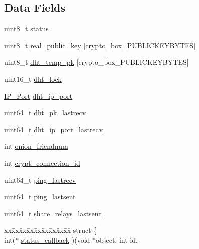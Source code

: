 \subsection*{Data Fields}
\begin{DoxyCompactItemize}
\item 
uint8\+\_\+t \hyperlink{struct_friend___conn_ade818037fd6c985038ff29656089758d}{status}
\item 
uint8\+\_\+t \hyperlink{struct_friend___conn_a996dcaefa2a5954a199e2beb584c1feb}{real\+\_\+public\+\_\+key} \mbox{[}crypto\+\_\+box\+\_\+\+P\+U\+B\+L\+I\+C\+K\+E\+Y\+B\+Y\+T\+E\+S\mbox{]}
\item 
uint8\+\_\+t \hyperlink{struct_friend___conn_ab863a4d1023acff25635c1b4a36015a2}{dht\+\_\+temp\+\_\+pk} \mbox{[}crypto\+\_\+box\+\_\+\+P\+U\+B\+L\+I\+C\+K\+E\+Y\+B\+Y\+T\+E\+S\mbox{]}
\item 
uint16\+\_\+t \hyperlink{struct_friend___conn_a1da451cf7bce45009c3ae38c003f2ed8}{dht\+\_\+lock}
\item 
\hyperlink{struct_i_p___port}{I\+P\+\_\+\+Port} \hyperlink{struct_friend___conn_ace58c2ab8adca0a754bcd2527e88a9d2}{dht\+\_\+ip\+\_\+port}
\item 
uint64\+\_\+t \hyperlink{struct_friend___conn_a64eb95337c42cb30956ee42f7c42cf0e}{dht\+\_\+pk\+\_\+lastrecv}
\item 
uint64\+\_\+t \hyperlink{struct_friend___conn_a1b4abfeab3eeeb285cfc69b1ac8d84bb}{dht\+\_\+ip\+\_\+port\+\_\+lastrecv}
\item 
int \hyperlink{struct_friend___conn_a009e6d32e21cc7fb0c8caded782e974b}{onion\+\_\+friendnum}
\item 
int \hyperlink{struct_friend___conn_a5ca114d88c26607a45883173f86c7c20}{crypt\+\_\+connection\+\_\+id}
\item 
uint64\+\_\+t \hyperlink{struct_friend___conn_a5130c3c4a93050475770184608d61918}{ping\+\_\+lastrecv}
\item 
uint64\+\_\+t \hyperlink{struct_friend___conn_a1625b76f8f5277e17545953d96b893fb}{ping\+\_\+lastsent}
\item 
uint64\+\_\+t \hyperlink{struct_friend___conn_aa5f9fa72527b8eafd6457864f32d2701}{share\+\_\+relays\+\_\+lastsent}
\item 
\begin{tabbing}
xx\=xx\=xx\=xx\=xx\=xx\=xx\=xx\=xx\=\kill
struct \{\\
\>int($\ast$ \hyperlink{struct_friend___conn_a5b3bbefec1bad16d4dbacabf34692bd6}{status\_callback} )(void $\ast$object, int id, \\

\end{tabbing}
\end{DoxyCompactItemize}
